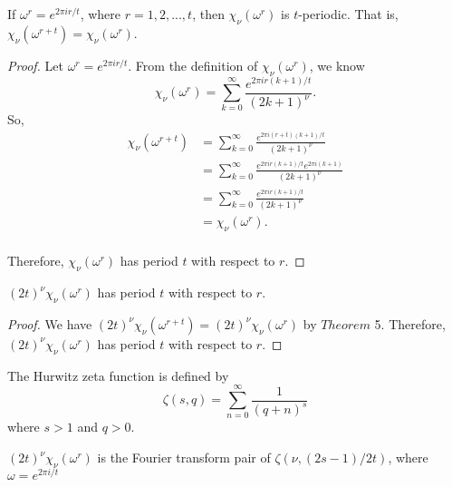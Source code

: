 \documentclass[../article.tex]{subfiles}
\begin{document}
\begin{theorem}
If $\omega^r = e^{2\pi i r/t}$, where $r=1,2,...,t$, then $\chi_{\nu}(\omega^r)$ is $t$-periodic. That is, $\chi_{\nu}(\omega^{r+t}) = \chi_{\nu}(\omega^r)$.
\end{theorem}

\begin{proof}
Let $\omega^r = e^{2\pi i r/t}$. From the definition of $\chi_{\nu}(\omega^r)$, we know
\begin{equation}
\chi_{\nu}(\omega^{r}) = \sum_{k=0}^{\infty} \frac{e^{2 \pi i r(k+1)/t}}{(2k+1)^{\nu}}.
\end{equation}
So,\newline
\begin{equation}
\begin{split}
\chi_{\nu}(\omega^{r+t}) &= \sum_{k=0}^{\infty} \frac{e^{2 \pi i (r+t)(k+1)/t}}{(2k+1)^{\nu}} \\
&= \sum_{k=0}^{\infty} \frac{e^{2 \pi i r(k+1)/t}e^{2 \pi i(k+1)}}{(2k+1)^{\nu}} \\
&= \sum_{k=0}^{\infty} \frac{e^{2 \pi i r(k+1)/t}}{(2k+1)^{\nu}} \\
&= \chi_{\nu}(\omega^r).\\
\end{split}
\end{equation}

Therefore, $\chi_{\nu}(\omega^r)$ has period $t$ with respect to $r$.
\end{proof}

\begin{corollary}
$(2t)^{\nu} \chi_{\nu}(\omega^r)$ has period $t$ with respect to $r$.
\end{corollary}

\begin{proof}
We have $(2t)^{\nu} \chi_{\nu}(\omega^{r+t}) = (2t)^{\nu} \chi_{\nu}(\omega^r)$ by $Theorem$ 5. Therefore, $(2t)^{\nu} \chi_{\nu}(\omega^r)$ has period $t$ with respect to $r$.
\end{proof}

\begin{definition}
The Hurwitz zeta function is defined by
\begin{equation}
\zeta(s,q) = \sum_{n=0}^{\infty} \frac{1}{(q+n)^s}
\end{equation}
where $s > 1$ and $q > 0$.
\end{definition}

\begin{theorem}
$(2t)^\nu \chi_{\nu}(\omega^{r})$ is the Fourier transform pair of $\zeta(\nu, (2s-1)/2t)$, where $\omega = e^{2\pi i/t}$
\end{theorem}
\end{document}
